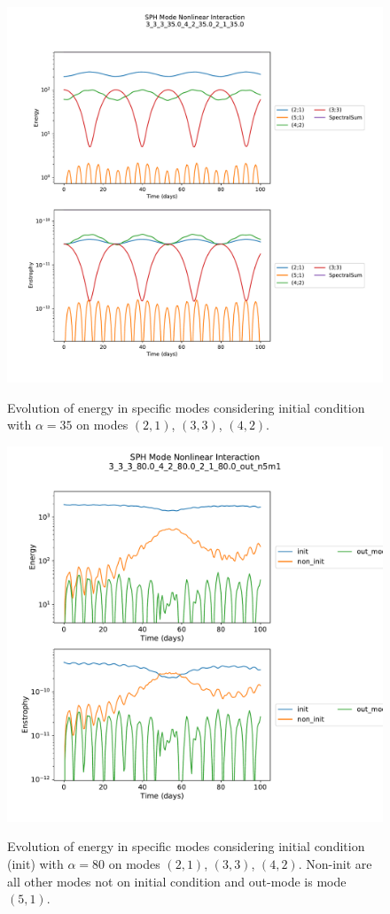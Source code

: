 \documentclass[a4paper,10pt]{article}
\begin{document}
\begin{figure}
\centering
 \includegraphics[scale=0.6]{figs/mode_evol_TC2_3-3-alpha35.pdf}
 \label{tc1-alpha35}
 \caption{Evolution of energy in specific modes considering initial condition with $\alpha=35$ on modes $(2,1)$, $(3,3)$, $(4,2)$.}
\end{figure}


\begin{figure}
\centering
 \includegraphics[scale=0.6]{figs/out_n5m1-alpha80.pdf}
 \label{tc1-alpha80}
 \caption{Evolution of energy in specific modes considering initial condition (init) with $\alpha=80$ on modes $(2,1)$, $(3,3)$, $(4,2)$. Non-init are all other modes not on initial condition and out-mode is mode $(5,1)$.}
\end{figure}
\end{document}

